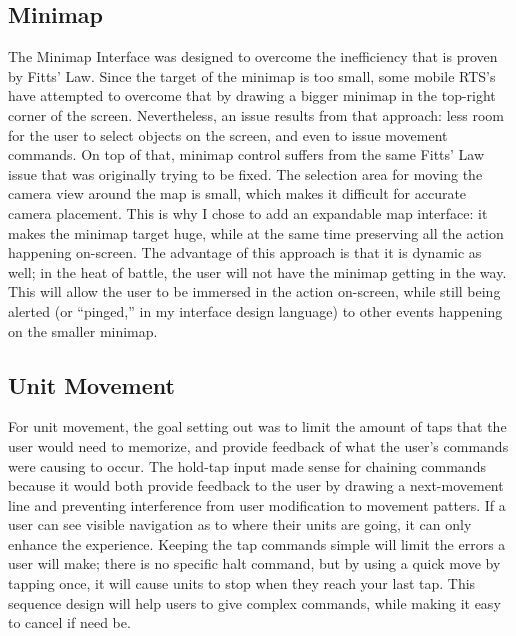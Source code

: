 \documentclass[11pt]{article}
\begin{document}
	\subsection{Minimap}
	The Minimap Interface was designed to overcome the inefficiency that is proven by Fitts' Law. Since the target of the minimap is too small, some mobile RTS's have attempted to overcome that by drawing a bigger minimap in the top-right corner of the screen. Nevertheless, an issue results from that approach: less room for the user to select objects on the screen, and even to issue movement commands. On top of that, minimap control suffers from the same Fitts' Law issue that was originally trying to be fixed. The selection area for moving the camera view around the map is small, which makes it difficult for accurate camera placement. This is why I chose to add an expandable map interface: it makes the minimap target huge, while at the same time preserving all the action happening on-screen. The advantage of this approach is that it is dynamic as well; in the heat of battle, the user will not have the minimap getting in the way. This will allow the user to be immersed in the action on-screen, while still being alerted (or ``pinged,'' in my interface design language) to other events happening on the smaller minimap.
	\subsection{Unit Movement}
	For unit movement, the goal setting out was to limit the amount of taps that the user would need to memorize, and provide feedback of what the user's commands were causing to occur. The hold-tap input made sense for chaining commands because it would both provide feedback to the user by drawing a next-movement line and preventing interference from user modification to movement patters. If a user can see visible navigation as to where their units are going, it can only enhance the experience. Keeping the tap commands simple will limit the errors a user will make; there is no specific halt command, but by using a quick move by tapping once, it will cause units to stop when they reach your last tap. This sequence design will help users to give complex commands, while making it easy to cancel if need be.
\end{document}
